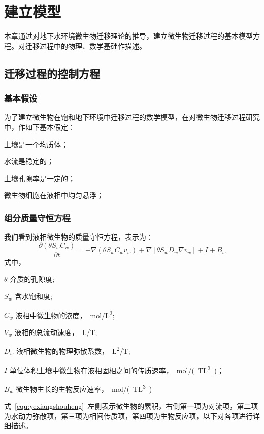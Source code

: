 \chapter{建立模型}
本章通过对地下水环境微生物迁移理论的推导，建立微生物迁移过程的基本模型方程。对迁移过程中的物理、数学基础作描述。
\section{迁移过程的控制方程}
\subsection{基本假设}
为了建立微生物在饱和地下环境中迁移过程的数学模型，在对微生物迁移过程研究中，作如下基本假定：
\begin{asparaenum}[(1)]
\item 土壤是一个均质体； 
\item 水流是稳定的； 
\item 土壤孔隙率是一定的； 
\item 微生物细胞在液相中均匀悬浮； 
\end{asparaenum}\par
\subsection{组分质量守恒方程}
我们看到液相微生物的质量守恒方程，表示为：
\begin{equation}\label{equ:yexiangshouheng}
\dfrac{\partial(\theta S_w C_w)}{\partial t}
=-\nabla(\theta S_w C_w v_w)+\nabla[\theta S_wD_w\nabla v_w]+I+B_w
\end{equation}
式中，
\begin{paralist}
	\item[$\theta$]介质的孔隙度;
	\item[$S_w$]含水饱和度;
	\item[$C_w$]液相中微生物的浓度，\SI{}{mol/L^3};
	\item[$V_w$]液相的总流动速度，\SI{}{L/T};
	\item[$D_w$]液相微生物的物理弥散系数，\SI{}{L^2/T};
	\item[$I$]单位体积土壤中微生物在液相固相之间的传质速率，\SI{}{mol/(TL^3)}；
	\item[$B_w$]微生物生长的生物反应速率，\SI{}{mol/(TL^3)}
\end{paralist}
式~\ref{equ:yexiangshouheng}~左侧表示微生物的累积，右侧第一项为对流项，第二项为水动力弥散项，第三项为相间传质项，第四项为生物反应项，以下对各项进行详细描述。
